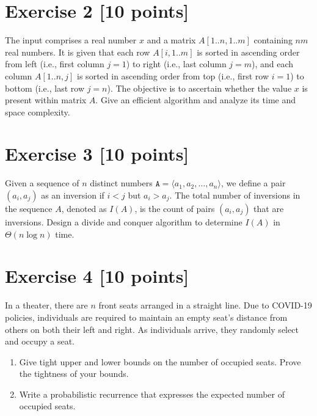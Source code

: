 \documentclass[11pt]{article}
\theoremstyle{theorem}
\theoremstyle{lemma}
\theoremstyle{corollary}
\theoremstyle{definition}
\begin{document}
\section*{Exercise 2 [10 points]}



The input comprises a real number \( x \) and a matrix \( A[1..n, 1..m] \) containing \( nm \) real numbers. It is given that each row \( A[i, 1..m] \) is sorted in ascending order from left (i.e., first column $j=1$) to right (i.e., last column $j=m$), and each column \( A[1..n, j] \) is sorted in ascending order from top (i.e., first row $i=1$) to bottom  (i.e., last row $j=n$). The objective is to ascertain whether the value \( x \) is present within matrix \( A \).  Give an efficient algorithm and analyze its time and space complexity. 



\section*{Exercise 3 [10 points]} 

Given a sequence of \( n \) distinct numbers \(  \texttt{A} = \langle a_1, a_2, \ldots, a_n \rangle \), we define a pair \( (a_i, a_j) \) as an inversion if \( i < j \) but \( a_i > a_j \). The total number of inversions in the sequence \( A \), denoted as \( I(A) \), is the count of pairs \( (a_i, a_j) \) that are inversions.   Design a divide and conquer algorithm to determine \( I(A) \) in \( \Theta(n \log n) \) time.


\section*{Exercise 4 [10 points]} 

In a theater, there are \(n\) front seats arranged in a straight line. Due to COVID-19 policies, individuals are required to maintain an empty seat's distance from others on both their left and right. As individuals arrive, they randomly select and occupy a seat.

 \begin{enumerate}
         \item Give tight upper and    lower bounds  on the number of occupied seats. Prove the tightness of your bounds. 
     \item Write a probabilistic recurrence that expresses the expected number of occupied seats. 
 \end{enumerate}
\end{document}
